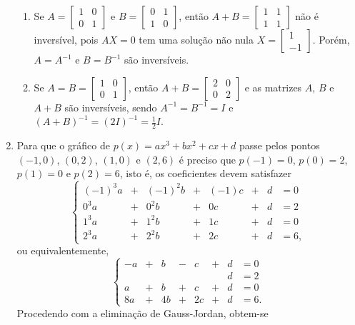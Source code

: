 \documentclass[12pt,a4paper]{article}
\begin{document}
\begin{enumerate}
\begin{enumerate}
\item Se
$A = \begin{bmatrix}
1 & 0 \\
0 & 1
\end{bmatrix}$
e 
$B = \begin{bmatrix}
0 & 1 \\
1 & 0
\end{bmatrix}$, então
$A + B
= \begin{bmatrix}
1 & 1 \\
1 & 1
\end{bmatrix}$ não é inversível, pois $AX = 0$ tem uma solução não nula $X = \begin{bmatrix}
1\\-1
\end{bmatrix}$. Porém, $A = A^{-1}$ e $B = B^{-1}$ são inversíveis.

\item Se
$A = B = \begin{bmatrix}
1 & 0 \\
0 & 1
\end{bmatrix}$, então
$A + B
= \begin{bmatrix}
2 & 0 \\
0 & 2
\end{bmatrix}$ e as matrizes $A$, $B$ e $A+B$ são inversíveis, sendo  $A^{-1} = B^{-1} = I$ e $(A+B)^{-1} = (2I)^{-1} = \frac{1}{2} I$.
\end{enumerate}
\item Para que o gráfico de $p(x) = ax^3+bx^2+cx+d$ passe pelos pontos $(-1,0)$, $(0,2)$, $(1,0)$ e $(2,6)$ é preciso que $p(-1)=0$, $p(0)=2$, $p(1)=0$ e $p(2)=6$, isto é, os coeficientes devem satisfazer
\[
\left\{
\begin{alignedat}{4}
(-1)^3a & {}+{} & (-1)^2b & {}+{} & (-1)c & {}+{} & d & = 0\\
   0^3a & {}+{} &    0^2b & {}+{} &    0c & {}+{} & d & = 2\\
   1^3a & {}+{} &    1^2b & {}+{} &    1c & {}+{} & d & = 0\\
   2^3a & {}+{} &    2^2b & {}+{} &    2c & {}+{} & d & = 6,
\end{alignedat}
\right.
\]
ou equivalentemente,
\[
\left\{
\begin{alignedat}{4}
-a & {}+{} &  b & {}-{} &  c & {}+{} & d & = 0\\
   &       &    &       &    &       & d & = 2\\
 a & {}+{} &  b & {}+{} &  c & {}+{} & d & = 0\\
8a & {}+{} & 4b & {}+{} & 2c & {}+{} & d & = 6.
\end{alignedat}
\right.
\]
Procedendo com a eliminação de Gauss-Jordan, obtem-se


\end{enumerate}
\end{document}
